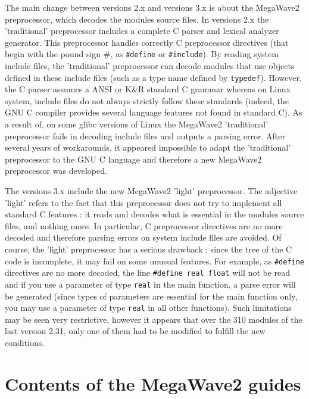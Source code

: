 The main change between versions 2.x and versions 3.x is about the MegaWave2 preprocessor, which decodes the modules source files.
In versions 2.x the 'traditional' preprocessor includes a complete C parser and lexical analyzer generator. 
This preprocessor handles correctly C preprocessor directives (that begin with the pound sign \#, as {\tt \#define} or {\tt \#include}). 
By reading system include files, the 'traditional' preprocessor can decode modules that use objects defined in these include files (such as a type 
name defined by {\tt typedef}). However, the C parser assumes a ANSI or K\&R standard C grammar whereas on Linux system, include files do not
always strictly follow these standards (indeed, the GNU C compiler provides several language features not found in standard C).
As a result of, on some glibc versions of Linux the MegaWave2 'traditional' preprocessor fails in decoding include files and outputs a parsing error.
After several years of workarounds, it appeared impossible to adapt the 'traditional' preprocessor to the GNU C language and therefore
a new MegaWave2 preprocessor was developed.

The versions 3.x include the new MegaWave2 'light' preprocessor. The adjective 'light' refers to the fact that this 
preprocessor does not try to implement all standard C features : it reads and decodes what is essential in the modules source files, and nothing more.
In particular, C preprocessor directives are no more decoded and therefore parsing errors on system include files are avoided.
Of course, the 'light' preprocessor has a serious drawback : since the tree of the C code is incomplete, it may fail on some unusual features.
For example, as {\tt \#define} directives are no more decoded, the line {\tt \#define real float} will not be read and if you use a parameter of type
{\tt real} in the main function, a parse error will be generated (since types of parameters are essential for the main function only, you may use 
a parameter of type {\tt real} in all other functions). Such limitations may be seen very restrictive, however it appears that over the 310 modules
of the last version 2.31, only one of them had to be modified to fulfill the new conditions.


\section{Contents of the MegaWave2 guides}
\label{intro_all-guides}

